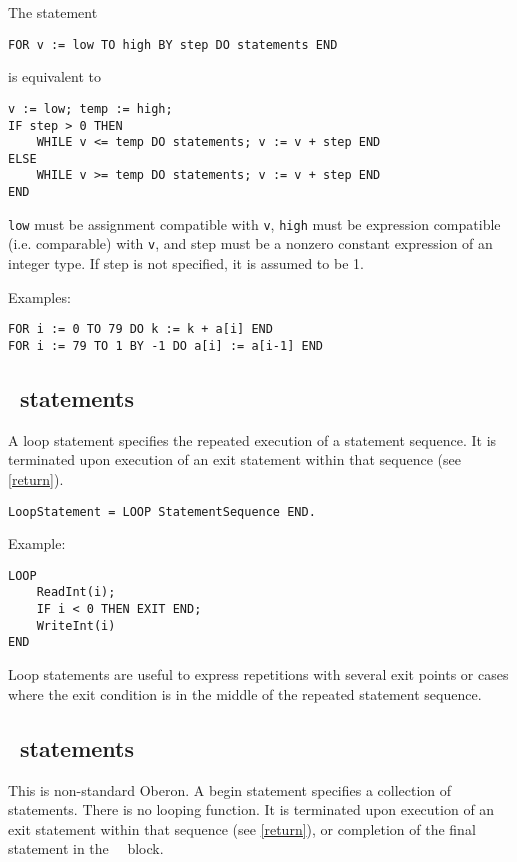 \documentclass[12pt]{article}
\begin{document}
The statement

\begin{lstlisting}[style=example]
FOR v := low TO high BY step DO statements END
\end{lstlisting} 

is equivalent to

\begin{lstlisting}[style=example]
v := low; temp := high; 
IF step > 0 THEN
    WHILE v <= temp DO statements; v := v + step END 
ELSE
    WHILE v >= temp DO statements; v := v + step END 
END
\end{lstlisting} 
    
\lstinline!low! must be assignment compatible with \lstinline!v!, \lstinline!high! must be expression compatible (i.e. comparable) with \lstinline!v!, and step must be a nonzero constant expression of an integer type. If step is not specified, it is assumed to be 1.

Examples:
\begin{lstlisting}[style=example]
FOR i := 0 TO 79 DO k := k + a[i] END
FOR i := 79 TO 1 BY -1 DO a[i] := a[i-1] END
\end{lstlisting} 

\subsection{\LOOP\ statements}

A loop statement specifies the repeated execution of a statement sequence. It is terminated upon execution of an exit statement within that sequence (see \ref{return}).

\begin{lstlisting}[style=example]
LoopStatement = LOOP StatementSequence END.
\end{lstlisting} 

Example:
\begin{lstlisting}[style=example]
LOOP
    ReadInt(i);
    IF i < 0 THEN EXIT END; 
    WriteInt(i)
END
\end{lstlisting} 

Loop statements are useful to express repetitions with several exit points or cases where the exit condition is in the middle of the repeated statement sequence.

\subsection{\BEGIN\ statements}

This is non-standard Oberon. A begin statement specifies a collection of statements. There is no looping function.  It is terminated upon execution of an exit statement within that sequence (see \ref{return}), or completion of the final statement in the \BEGIN\ \END\ block.
\end{document}
